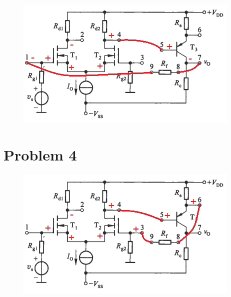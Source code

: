 \documentclass{article}
\begin{document}
\begin{figure}[H]
  \centering
  \includegraphics[width=0.3\linewidth]{figures/Problem8363}
\end{figure}

\section{Problem 4}

\begin{figure}[H]
  \centering
  \includegraphics[width=0.3\linewidth]{figures/Problem8364}
\end{figure}
\end{document}

